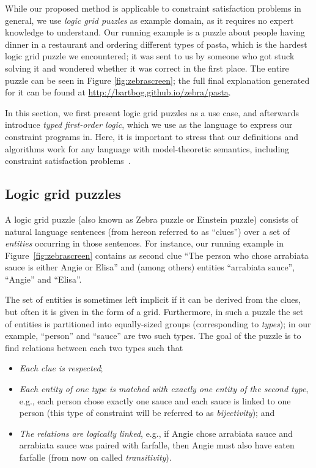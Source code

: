 While our proposed method is applicable to constraint satisfaction problems in general, we use \textit{logic grid puzzles} as example domain, as it requires no expert knowledge to understand.
Our running example is a puzzle about people having dinner in a restaurant and ordering different types of pasta, which is the hardest logic grid puzzle we encountered; it was sent to us by someone who got stuck solving it and wondered whether it was correct in the first place.    
The entire puzzle can be seen in Figure \ref{fig:zebrascreen}; the full final explanation generated for it can be found at \url{http://bartbog.github.io/zebra/pasta}.

In this section, we first present logic grid puzzles as a use case, and afterwards introduce \emph{typed first-order logic}, which we use as the language to express our constraint programs in. Here, it is important to stress that our definitions and algorithms work for any language with model-theoretic semantics, including constraint satisfaction problems~\cite{rossi2006handbook}.


\subsection{Logic grid puzzles}
A logic grid puzzle (also known as Zebra puzzle or Einstein puzzle) consists of natural language sentences (from hereon referred to as ``clues'') over a set of \emph{entities} occurring in those sentences. 
For instance, our running example in Figure~\ref{fig:zebrascreen} contains as second clue ``The person who chose arrabiata sauce is either Angie or Elisa'' and (among others) entities ``arrabiata sauce'', ``Angie'' and ``Elisa''. 

The set of entities is sometimes left implicit if it can be derived from the clues, but often it is given in the form of a grid. 
Furthermore, in such a puzzle the set of entities is partitioned into equally-sized groups (corresponding to \emph{types}); in our example, ``person'' and ``sauce'' are two such types. 
% 
The goal of the puzzle is to find relations between each two types such that
\begin{itemize}
	\item \textit{Each clue is respected}; 
	\item \textit{Each entity of one type is matched with exactly one entity of the second type}, e.g., each person chose exactly one sauce and each sauce is linked to one person (this type of constraint will be referred to as \emph{bijectivity}); and 
	\item \textit{The relations are logically linked}, e.g., if Angie chose arrabiata sauce and arrabiata sauce was paired with farfalle, then Angie must also have eaten farfalle (from now on called \emph{transitivity}). 
\end{itemize}

